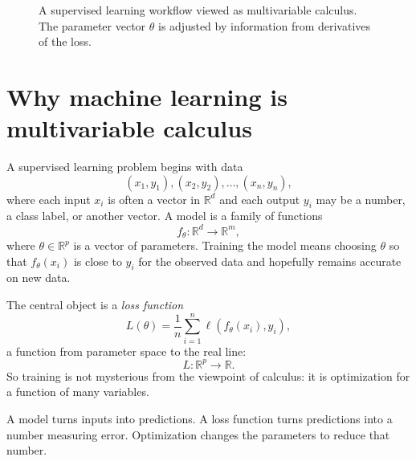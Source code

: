 \documentclass[11pt,oneside]{book}
\newcommand{\R}{\mathbb R}
\newcommand{\grad}{\nabla}
\begin{document}
\begin{figure}[H]
\centering
{}
\caption{A supervised learning workflow viewed as multivariable calculus. The parameter vector $\theta$ is adjusted by information from derivatives of the loss.}
\end{figure}

\section{Why machine learning is multivariable calculus}

A supervised learning problem begins with data
\[
(x_1,y_1),(x_2,y_2),\ldots,(x_n,y_n),
\]
where each input $x_i$ is often a vector in $\R^d$ and each output $y_i$ may be a number, a class label, or another vector. A model is a family of functions
\[
f_\theta:\R^d\to\R^m,
\]
where $\theta\in\R^p$ is a vector of parameters. Training the model means choosing $\theta$ so that $f_\theta(x_i)$ is close to $y_i$ for the observed data and hopefully remains accurate on new data.

The central object is a \emph{loss function}
\[
L(\theta)=\frac1n\sum_{i=1}^n \ell(f_\theta(x_i),y_i),
\]
a function from parameter space to the real line:
\[
L:\R^p\to\R.
\]
So training is not mysterious from the viewpoint of calculus: it is optimization for a function of many variables.

\begin{mainideabox}
A model turns inputs into predictions. A loss function turns predictions into a number measuring error. Optimization changes the parameters to reduce that number.
\end{mainideabox}
\end{document}

